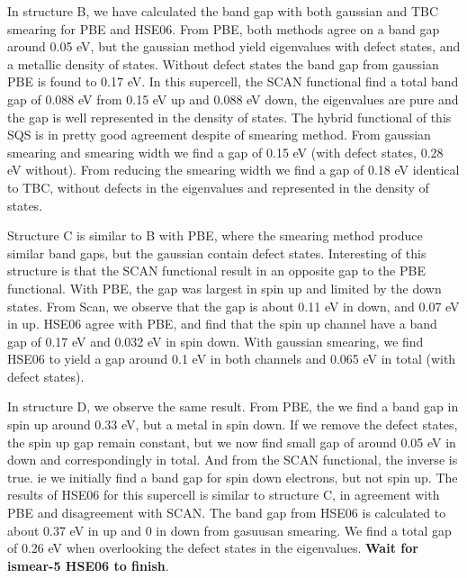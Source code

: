 In structure B, we have calculated the band gap with both gaussian and TBC smearing for PBE and HSE06. From PBE, both methods agree on a band gap around 0.05 eV, but the gaussian method yield eigenvalues with defect states, and a metallic density of states. Without defect states the band gap from gaussian PBE is found to 0.17 eV. In this supercell, the SCAN functional find a total band gap of 0.088 eV from 0.15 eV up and 0.088 eV down, the eigenvalues are pure and the gap is well represented in the density of states. The hybrid functional of this SQS is in pretty good agreement despite of smearing method. From gaussian smearing and smearing width we find a gap of 0.15 eV (with defect states, 0.28 eV without). From reducing the smearing width we find a gap of 0.18 eV identical to TBC, without defects in the eigenvalues and represented in the density of states. 

Structure C is similar to B with PBE, where the smearing method produce similar band gaps, but the gaussian contain defect states. Interesting of this structure is that the SCAN functional result in an opposite gap to the PBE functional. With PBE, the gap was largest in spin up and limited by the down states. From Scan, we observe that the gap is about 0.11 eV in down, and 0.07 eV in up. HSE06 agree with PBE, and find that the spin up channel have a band gap of 0.17 eV and 0.032 eV in spin down. With gaussian smearing, we find HSE06 to yield a gap around 0.1 eV in both channels and 0.065 eV in total (with defect states).

In structure D, we observe the same result. From PBE, the we find a band gap in spin up around 0.33 eV, but a metal in spin down. If we remove the defect states, the spin up gap remain constant, but we now find small gap of around 0.05 eV in down and correspondingly in total. And from the SCAN functional, the inverse is true. ie we initially find a band gap for spin down electrons, but not spin up. The results of HSE06 for this supercell is similar to structure C, in agreement with PBE and disagreement with SCAN. The band gap from HSE06 is calculated to about 0.37 eV in up and 0 in down from gasuusan smearing. We find a total gap of 0.26 eV when overlooking the defect states in the eigenvalues. \textbf{Wait for ismear-5 HSE06 to finish}. 

